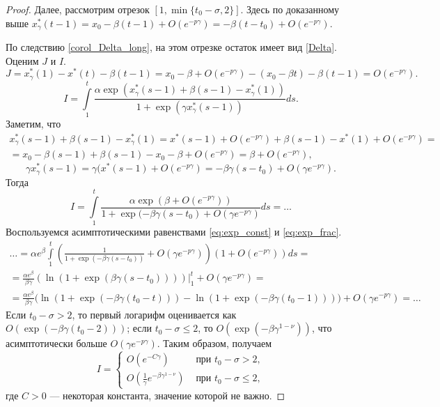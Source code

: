 \begin{proof}
Далее, рассмотрим отрезок $[1,\min\{t_0-\sigma,2\}]$. Здесь по доказанному выше $x_\gamma^*(t-1)=x_0-\beta (t-1)+O(e^{-p\gamma})=-\beta (t-t_0)+O(e^{-p\gamma})$. 

По следствию \eqref{corol_Delta_long}, на этом отрезке остаток имеет вид \eqref{Delta}. Оценим $J$ и $I$.
%
\[
J = x^*_{\gamma}(1) - x^*(t) - \beta (t - 1) = x_0 - \beta + O(e^{-p\gamma}) - (x_0 - \beta t) - \beta(t - 1) = O(e^{-p\gamma}).
\]
%
\[
I = \int\limits_{1}^{t}\frac{\alpha\exp(x_{\gamma}^*(s-1)+\beta(s-1)-x_{\gamma}^*(1))}{1 + \exp(\gamma x_{\gamma}^*(s-1))} ds.
\]
Заметим, что
\begin{multline*}
x_{\gamma}^*(s-1)+\beta(s-1)-x_{\gamma}^*(1) = x^*(s - 1) + O(e^{-p\gamma}) + \beta(s - 1) - x^*(1) + O(e^{-p\gamma}) =\\= x_0 - \beta(s - 1) + \beta(s - 1) - x_0 - \beta + O(e^{-p\gamma}) = \beta + O(e^{-p\gamma}),
\end{multline*}
\[
\gamma x^*_{\gamma}(s - 1) = \gamma (x^*(s - 1) + O(e^{-p\gamma}) = -\beta \gamma (s - t_0) + O(\gamma e^{-p\gamma}).
\]
Тогда 
\[
I = \int\limits_{1}^{t}\frac{\alpha\exp(\beta + O(e^{-p\gamma}))}{1 + \exp(-\beta \gamma (s - t_0) + O(\gamma e^{-p\gamma})} ds = \ldots
\]
Воспользуемся асимптотическими равенствами \eqref{eq:exp_const} и \eqref{eq:exp_frac}.
\begin{multline*}
\ldots = \alpha e^{\beta} \int\limits_{1}^{t}\left(\frac{1}{1 + \exp(-\beta \gamma (s - t_0))} + O(\gamma e^{-p\gamma})\right)(1 + O(e^{-p\gamma})) ds = \\
= \frac{\alpha e^{\beta}}{\beta \gamma} \left(\ln(1 + \exp(\beta \gamma (s - t_0)))\right)\bigg\vert_1^t + O(\gamma e^{-p\gamma}) = \\
= \frac{\alpha e^{\beta}}{\beta \gamma}  \big(\ln(1 + \exp(-\beta \gamma (t_0 - t))) - \ln(1 + \exp(-\beta \gamma (t_0 - 1)))\big) + O(\gamma e^{-p\gamma}) = \ldots 
\end{multline*}
%
Если $t_0 - \sigma > 2$, то первый логарифм оценивается как $O(\exp(-\beta \gamma (t_0 - 2)))$; если $t_0 - \sigma \leq 2$, то $O(\exp(-\beta \gamma^{1 - \nu}))$, что асимптотически больше $O(\gamma e^{-p\gamma})$. Таким образом, получаем
\[
I = 
\begin{cases}
O(e^{-C \gamma}) & \text{ при } t_0 - \sigma > 2,\\
O(\frac{1}{\gamma} e^{-\beta \gamma^{1 - \nu}}) & \text{ при } t_0 - \sigma \leq 2,
\end{cases}
\]
где $C > 0$ --- некоторая константа, значение которой не важно.


\end{proof}
